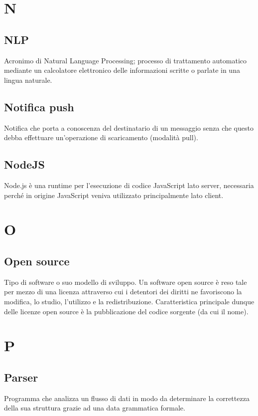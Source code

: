 \section*{N}
\subsection*{NLP}
Acronimo di Natural Language Processing; processo di trattamento automatico mediante un calcolatore elettronico delle informazioni scritte o parlate in una lingua naturale. 

\subsection*{Notifica push}
Notifica che porta a conoscenza del destinatario di un messaggio senza che questo debba effettuare un'operazione di scaricamento (modalità pull).

\subsection*{NodeJS}
Node.js è una runtime per l'esecuzione di codice JavaScript lato server, necessaria perché in origine JavaScript veniva utilizzato principalmente lato client.

\section*{O}

\subsection*{Open source}
Tipo di software o suo modello di sviluppo. Un software open source è reso tale per mezzo di una licenza attraverso cui i detentori dei diritti ne favoriscono la modifica, lo studio, l'utilizzo e la redistribuzione. Caratteristica principale dunque delle licenze open source è la pubblicazione del codice sorgente (da cui il nome). 

\section*{P}
\subsection*{Parser}
Programma che analizza un flusso di dati in modo da determinare la correttezza della sua struttura grazie ad una data grammatica formale. 


